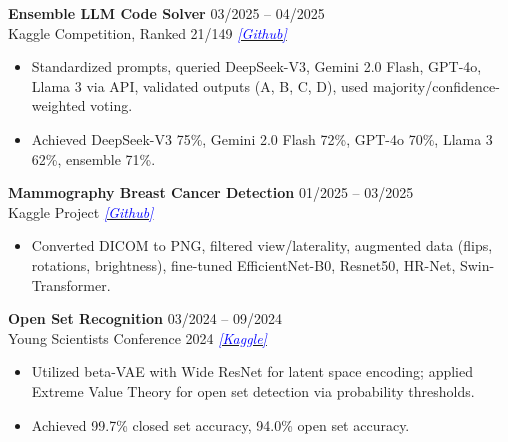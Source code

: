 \documentclass[10pt]{article}
\begin{document}
\textbf{Ensemble LLM Code Solver} \hfill 03/2025 -- 04/2025 \\
Kaggle Competition, Ranked 21/149  \hfill \href{https://github.com/taitruong256/CodeMMLU}{\textcolor{blue}{\textit{[Github]}}}

\begin{itemize}[noitemsep, topsep=0pt, partopsep=0pt, parsep=0pt]
    \item Standardized prompts, queried DeepSeek-V3, Gemini 2.0 Flash, GPT-4o, Llama 3 via API, validated outputs (A, B, C, D), used majority/confidence-weighted voting.
    \item Achieved DeepSeek-V3 75\%, Gemini 2.0 Flash 72\%, GPT-4o 70\%, Llama 3 62\%, ensemble 71\%.
\end{itemize}


\textbf{Mammography Breast Cancer Detection} \hfill 01/2025 -- 03/2025 \\
Kaggle Project \hfill \href{https://github.com/taitruong256/BreastCancer}{\textcolor{blue}{\textit{[Github]}}}

\begin{itemize}[noitemsep, topsep=0pt, partopsep=0pt, parsep=0pt]
    \item Converted DICOM to PNG, filtered view/laterality, augmented data (flips, rotations, brightness), fine-tuned EfficientNet-B0, Resnet50, HR-Net, Swin-Transformer.
\end{itemize}


\textbf{Open Set Recognition} \hfill 03/2024 -- 09/2024 \\
Young Scientists Conference 2024 \hfill  \href{https://www.kaggle.com/code/taitruong256/openset-recognization-pytorch}{\textcolor{blue}{\textit{[Kaggle]}}}

\begin{itemize}[noitemsep, topsep=0pt, partopsep=0pt, parsep=0pt]
    \item Utilized beta-VAE with Wide ResNet for latent space encoding; applied Extreme Value Theory for open set detection via probability thresholds.
    \item Achieved 99.7\% closed set accuracy, 94.0\% open set accuracy.
\end{itemize}

\begin{center}
    \vspace{0.05cm}
    \hrulefill
    \vspace{0.05cm}
\end{center}
\end{document}
